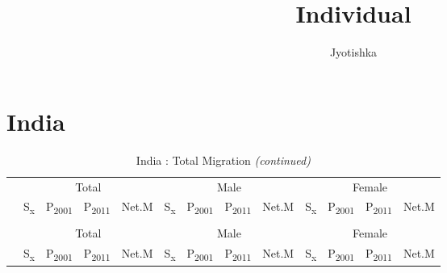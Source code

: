 \documentclass[
  12pt,
]{article}
\title{Individual}
\author{Jyotishka}
\date{}
\begin{document}
\maketitle

\pagebreak

\hypertarget{india}{%
\section{India}\label{india}}

\begingroup\fontsize{9.7}{11.7}\selectfont

\begin{longtable}[t]{lcccccccccccc}
\caption{\label{tab:unnamed-chunk-1}India : Total Migration}\\
\toprule
\multicolumn{1}{c}{ } & \multicolumn{4}{c}{Total} & \multicolumn{4}{c}{Male} & \multicolumn{4}{c}{Female} \\
\cmidrule(l{3pt}r{3pt}){2-5} \cmidrule(l{3pt}r{3pt}){6-9} \cmidrule(l{3pt}r{3pt}){10-13}
  & S\textsubscript{x} & P\textsubscript{2001} & P\textsubscript{2011} & Net.M & S\textsubscript{x} & P\textsubscript{2001} & P\textsubscript{2011} & Net.M & S\textsubscript{x} & P\textsubscript{2001} & P\textsubscript{2011} & Net.M\\
\midrule
\endfirsthead
\caption[]{India : Total Migration \textit{(continued)}}\\
\toprule
\multicolumn{1}{c}{ } & \multicolumn{4}{c}{Total} & \multicolumn{4}{c}{Male} & \multicolumn{4}{c}{Female} \\
\cmidrule(l{3pt}r{3pt}){2-5} \cmidrule(l{3pt}r{3pt}){6-9} \cmidrule(l{3pt}r{3pt}){10-13}
  & S\textsubscript{x} & P\textsubscript{2001} & P\textsubscript{2011} & Net.M & S\textsubscript{x} & P\textsubscript{2001} & P\textsubscript{2011} & Net.M & S\textsubscript{x} & P\textsubscript{2001} & P\textsubscript{2011} & Net.M\\
\midrule
\endhead


\end{longtable}
\end{document}
